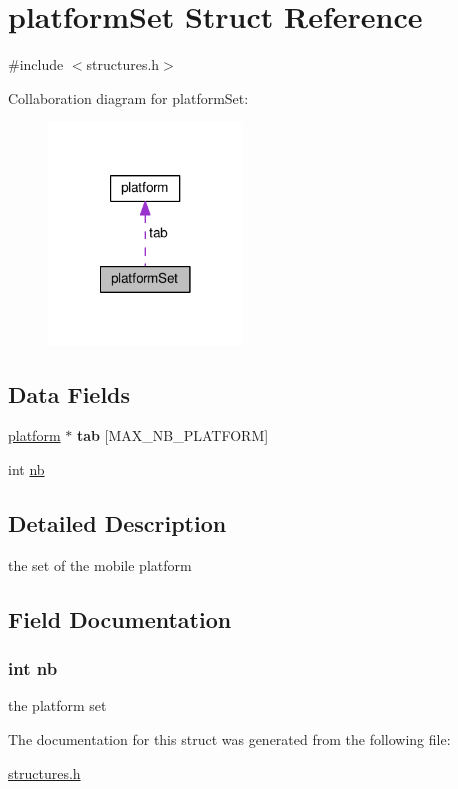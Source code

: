 \hypertarget{structplatform_set}{\section{platform\-Set Struct Reference}
\label{structplatform_set}
}


{\ttfamily \#include $<$structures.\-h$>$}



Collaboration diagram for platform\-Set\-:
\nopagebreak
\begin{figure}[H]
\begin{center}
\leavevmode
\includegraphics[width=146pt]{structplatform_set__coll__graph}
\end{center}
\end{figure}
\subsection*{Data Fields}
\begin{DoxyCompactItemize}
\item 
\hypertarget{structplatform_set_adc68016a9ab856bd20fb14c5c71c234a}{\hyperlink{structplatform}{platform} $\ast$ {\bfseries tab} \mbox{[}M\-A\-X\-\_\-\-N\-B\-\_\-\-P\-L\-A\-T\-F\-O\-R\-M\mbox{]}}\label{structplatform_set_adc68016a9ab856bd20fb14c5c71c234a}

\item 
int \hyperlink{structplatform_set_ab310c6afcc676eab3930dce2650511c0}{nb}
\end{DoxyCompactItemize}


\subsection{Detailed Description}
the set of the mobile platform 

\subsection{Field Documentation}
\hypertarget{structplatform_set_ab310c6afcc676eab3930dce2650511c0}{
\subsubsection[{nb}]{\setlength{\rightskip}{0pt plus 5cm}int nb}}\label{structplatform_set_ab310c6afcc676eab3930dce2650511c0}
the platform set 

The documentation for this struct was generated from the following file\-:\begin{DoxyCompactItemize}
\item 
\hyperlink{structures_8h}{structures.\-h}\end{DoxyCompactItemize}
